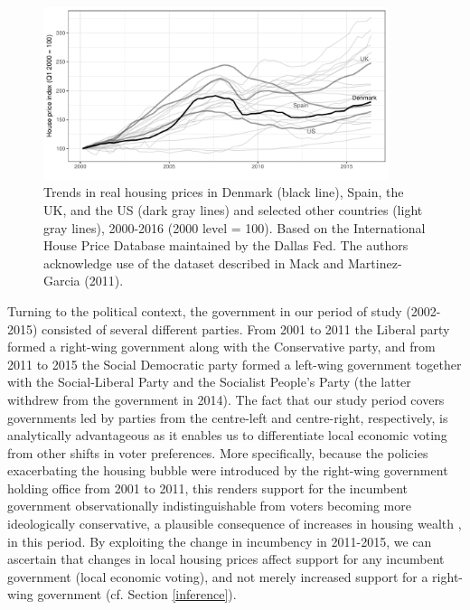 \documentclass[12pt,a4paper]{article}
\begin{document}
	\begin{figure}[htbp!]
		\includegraphics[width=0.9\textwidth]{../figures/timeplot}
		\centering
		\caption{Trends in real housing prices in Denmark (black line), Spain, the UK, and the US (dark gray lines) and selected other countries (light gray lines), 2000-2016 (2000 level = 100). Based on the International House Price Database maintained by the Dallas Fed. The authors acknowledge use of the dataset described in Mack and Martinez-Garcia (2011).}\label{hpd}
	\end{figure}
	
	Turning to the political context, the government in our period of study (2002-2015) consisted of several different parties. From 2001 to 2011 the Liberal party formed a right-wing government along with the Conservative party, and from 2011 to 2015 the Social Democratic party formed a left-wing government together with the Social-Liberal Party and the Socialist People’s Party (the latter withdrew from the government in 2014). The fact that our study period covers governments led by parties from the centre-left and centre-right, respectively, is analytically advantageous as it enables us to differentiate local economic voting from other shifts in voter preferences. More specifically, because the policies exacerbating the housing bubble were introduced by the right-wing government holding office from 2001 to 2011, this renders support for the incumbent government observationally indistinguishable from voters becoming more ideologically conservative, a plausible consequence of increases in housing wealth \citep{ansell2014political}, in this period. By exploiting the change in incumbency in 2011-2015, we can ascertain that changes in local housing prices affect support for any incumbent government (local economic voting), and not merely increased support for a right-wing government (cf. Section \ref{inference}). 
	
\end{document}
